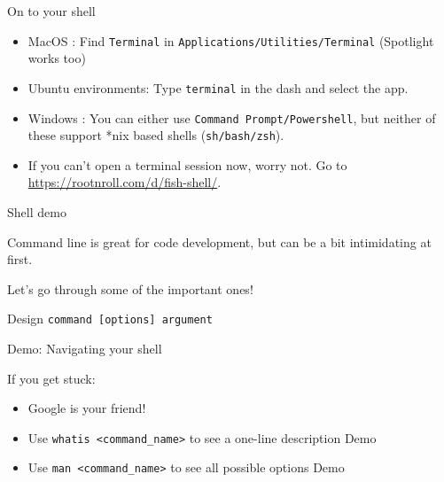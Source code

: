 \documentclass[presentation]{beamer}
\begin{document}
\begin{frame}[label={sec:orga109e2c},fragile]{On to your shell}
 \begin{itemize}
\item MacOS : Find \texttt{Terminal} in \texttt{Applications/Utilities/Terminal} (Spotlight
works too)
\item Ubuntu environments: Type \texttt{terminal} in the dash and select the app.
\item Windows : You can either use \texttt{Command Prompt/Powershell}, but neither of
these support *nix based shells (\texttt{sh/bash/zsh}).
\item If you can't open a terminal session now, worry not. Go to
\url{https://rootnroll.com/d/fish-shell/}.
\end{itemize}
\end{frame}

\begin{frame}[label={sec:org076901f},fragile]{Shell demo}
 \begin{block}{Command line is great for code development, but can be a bit intimidating at first.}
\end{block}
Let's go through some of the important ones!

\begin{block}{Design}
\texttt{command [options] argument}
\end{block}
\alert{Demo: Navigating your shell}

If you get stuck:
\begin{itemize}
\item Google is your friend!
\item Use \texttt{whatis <command\_name>} to see a one-line description \alert{Demo}
\item Use \texttt{man <command\_name>} to see all possible options \alert{Demo}
\end{itemize}
\end{frame}
\end{document}
